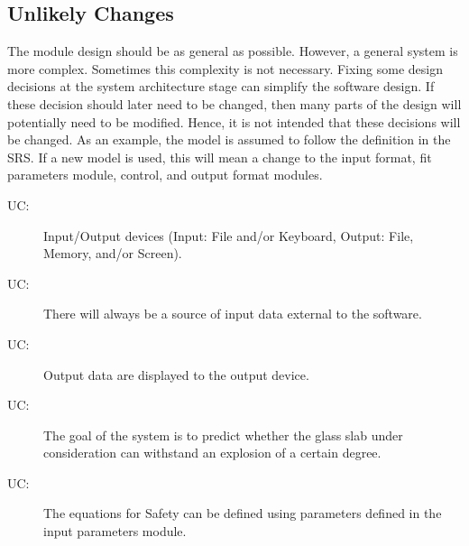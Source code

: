 \documentclass[12pt]{article}
\newcounter{ucnum}
\newcommand{\uctheucnum}{UC\theucnum}
\begin{document}
\subsection{Unlikely Changes}
\label{Sec:UnliChan}
The module design should be as general as possible. However, a general system is more complex. Sometimes this complexity is not necessary. Fixing some design decisions at the system architecture stage can simplify the software design. If these decision should later need to be changed, then many parts of the design will potentially need to be modified. Hence, it is not intended that these decisions will be changed.  As an example, the model is assumed to follow the definition in the SRS.  If a new model is used, this will mean a change to the input format, fit parameters module, control, and output format modules.
\begin{description}
\item[\uctheucnum\label{UCIO}:]Input/Output devices (Input: File and/or Keyboard, Output: File, Memory, and/or Screen).
\end{description}
\begin{description}
\item[\uctheucnum\label{UCinputsource}:]There will always be a source of input data external to the software.
\end{description}
\begin{description}
\item[\uctheucnum\label{UCoutput}:]Output data are displayed to the output device.
\end{description}
\begin{description}
\item[\uctheucnum\label{UCgoal}:]The goal of the system is to predict whether the glass slab under consideration can withstand an explosion of a certain degree.
\end{description}
\begin{description}
\item[\uctheucnum\label{UCequations}:]The equations for Safety can be defined using parameters defined in the input parameters module.
\end{description}
\end{document}
